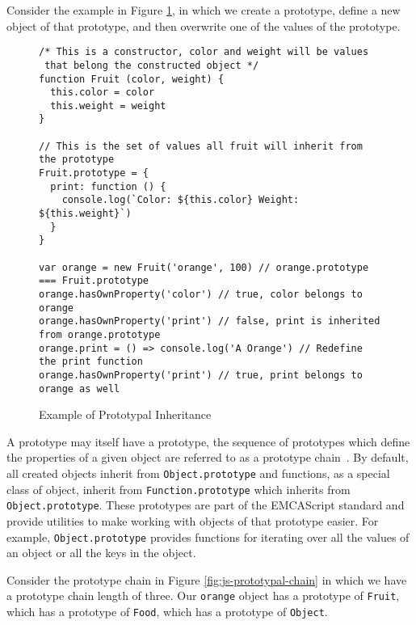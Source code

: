 \documentclass[]{final_report}
\begin{document}
Consider the example in Figure \ref{fig:js-prototypical-inheritance}, in which we create a prototype, define a new object of that prototype, and then overwrite one of the values of the prototype.

\begin{figure}[h]
\begin{verbatim}
/* This is a constructor, color and weight will be values
 that belong the constructed object */
function Fruit (color, weight) {
  this.color = color
  this.weight = weight
}

// This is the set of values all fruit will inherit from the prototype
Fruit.prototype = {
  print: function () {
    console.log(`Color: ${this.color} Weight: ${this.weight}`)
  }
}

var orange = new Fruit('orange', 100) // orange.prototype === Fruit.prototype
orange.hasOwnProperty('color') // true, color belongs to orange
orange.hasOwnProperty('print') // false, print is inherited from orange.prototype
orange.print = () => console.log('A Orange') // Redefine the print function
orange.hasOwnProperty('print') // true, print belongs to orange as well
\end{verbatim}
\caption{\label{fig:js-prototypical-inheritance} Example of Prototypal Inheritance}
\end{figure} 

A prototype may itself have a prototype, the sequence of prototypes which define the properties of a given object are referred to as a prototype chain~\cite{EcmaScript, borning1986classes}. By default, all created objects inherit from \lstinline{Object.prototype} and functions, as a special class of object, inherit from \lstinline{Function.prototype} which inherits from \lstinline{Object.prototype}. These prototypes are part of the EMCAScript standard and provide utilities to make working with objects of that prototype easier. For example, \lstinline{Object.prototype} provides functions for iterating over all the values of an object or all the keys in the object.

Consider the prototype chain in Figure \ref{fig:js-prototypal-chain} in which we have a prototype chain length of three. Our \lstinline{orange} object has a prototype of \lstinline{Fruit}, which has a prototype of \lstinline{Food}, which has a prototype of \lstinline{Object}.
\end{document}
